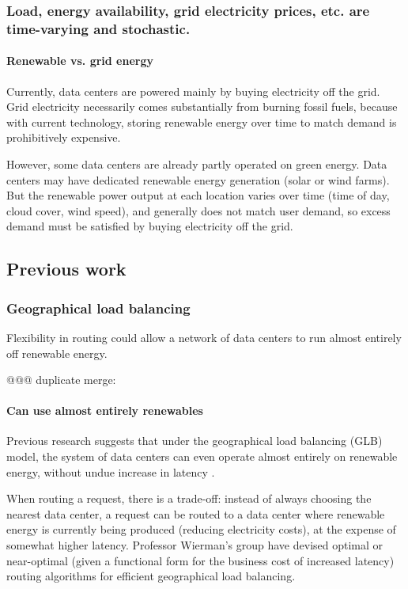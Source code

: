 \documentclass{acm_proc_article-sp}
\begin{document}
	\subsubsection{Load, energy availability, grid electricity prices, etc. are time-varying and stochastic.}
		\paragraph{Renewable vs. grid energy}
			Currently, data centers are powered mainly by buying electricity off the grid. Grid electricity necessarily comes substantially from burning fossil fuels, because with current technology, storing renewable energy over time to match demand is prohibitively expensive.
			
			However, some data centers are already partly operated on green energy. Data centers may have dedicated renewable energy generation (solar or wind farms). But the renewable power output at each location varies over time (time of day, cloud cover, wind speed), and generally does not match user demand, so excess demand must be satisfied by buying electricity off the grid.


\subsection{Previous work}
	\subsubsection{Geographical load balancing}
		Flexibility in routing could allow a network of data centers to run almost entirely off renewable energy. {@@@ duplicate merge: \paragraph{Can use almost entirely renewables}
			Previous research suggests that under the geographical load balancing (GLB) model, the system of data centers can even operate almost entirely on renewable energy, without undue increase in latency \cite{adam:GLB}.}
		When routing a request, there is a trade-off: instead of always choosing the nearest data center, a request can be routed to a data center where renewable energy is currently being produced (reducing electricity costs), at the expense of somewhat higher latency. Professor Wierman’s group have devised optimal or near-optimal (given a functional form for the business cost of increased latency) routing algorithms for efficient geographical load balancing.
		
\end{document}
